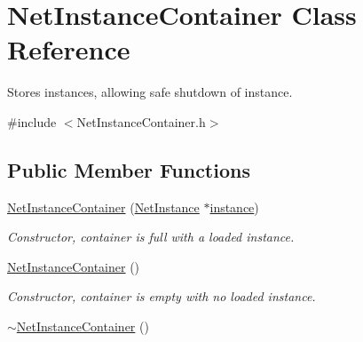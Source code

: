 \hypertarget{class_net_instance_container}{
\section{NetInstanceContainer Class Reference}
\label{class_net_instance_container}
}


Stores instances, allowing safe shutdown of instance.  




{\ttfamily \#include $<$NetInstanceContainer.h$>$}

\subsection*{Public Member Functions}
\begin{DoxyCompactItemize}
\item 
\hyperlink{class_net_instance_container_a5e8789579afb8cf040214378c7eca82e}{NetInstanceContainer} (\hyperlink{class_net_instance}{NetInstance} $\ast$\hyperlink{class_net_instance_container_a2089189c13983395ff68d1bc5fa6a690}{instance})
\begin{DoxyCompactList}\small\item\em Constructor, container is full with a loaded instance. \item\end{DoxyCompactList}\item 
\hypertarget{class_net_instance_container_a39dbba78298a80d44c62946f680482c4}{
\hyperlink{class_net_instance_container_a39dbba78298a80d44c62946f680482c4}{NetInstanceContainer} ()}
\label{class_net_instance_container_a39dbba78298a80d44c62946f680482c4}

\begin{DoxyCompactList}\small\item\em Constructor, container is empty with no loaded instance. \item\end{DoxyCompactList}\item 
\hypertarget{class_net_instance_container_adf23fb84b078dbb6cd6b520cd19fc68a}{
\hyperlink{class_net_instance_container_adf23fb84b078dbb6cd6b520cd19fc68a}{$\sim$NetInstanceContainer} ()}
\label{class_net_instance_container_adf23fb84b078dbb6cd6b520cd19fc68a}


\end{DoxyCompactItemize}
